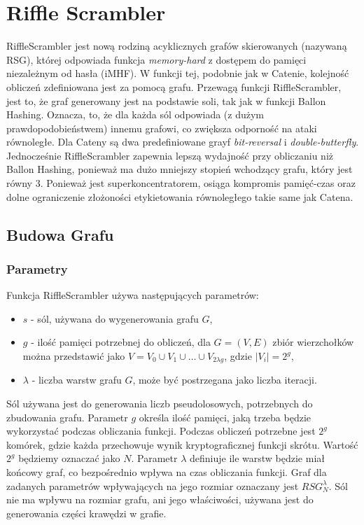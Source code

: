 \chapter{Riffle Scrambler}
\thispagestyle{chapterBeginStyle}

RiffleScrambler \cite{rs} jest nową rodziną acyklicznych grafów skierowanych (nazywaną RSG), której odpowiada funkcja \textit{memory-hard} z dostępem do pamięci niezależnym od hasła (iMHF).
W funkcji tej, podobnie jak w Catenie, kolejność obliczeń zdefiniowana jest za pomocą grafu. 
Przewagą funkcji RiffleScrambler, jest to, że graf generowany jest na podstawie soli, tak jak w funkcji Ballon Hashing. Oznacza, to, że dla każda sól odpowiada (z dużym prawdopodobieństwem) innemu grafowi, co zwiększa odporność na ataki równoległe. Dla Cateny są dwa predefiniowane grayf \textit{bit-reversal} i \textit{double-butterfly}.
Jednocześnie RiffleScrambler zapewnia lepszą wydajność przy obliczaniu niż Ballon Hashing, ponieważ ma dużo mniejszy stopień wchodzący grafu, który jest równy 3.
Ponieważ jest superkoncentratorem, osiąga kompromis pamięć-czas oraz dolne ograniczenie złożoności etykietowania równoległego takie same jak Catena.

\section{Budowa Grafu}

\subsection{Parametry}
Funkcja RiffleScrambler używa następujących parametrów:
\begin{itemize}
	\item $s$ - sól, używana do wygenerowania grafu $G$,
	
	\item $g$ - \label{rs::g} ilość pamięci potrzebnej do obliczeń, dla $G = (V, E)$ zbiór wierzchołków można przedstawić jako $V = V_{0} \cup V_{1} \cup \dots \cup V_{2 \lambda g}$, gdzie $|V_{i}| = 2^{g}$,
	
	\item $\lambda$ - liczba warstw grafu $G$, może być postrzegana jako liczba iteracji.
\end{itemize}

Sól używana jest do generowania liczb pseudolosowych, potrzebnych do zbudowania grafu.
Parametr $g$ określa ilość pamięci, jaką trzeba będzie wykorzystać podczas obliczania funkcji. Podczas obliczeń potrzebne jest $2^{g}$ komórek, gdzie każda przechowuje wynik kryptograficznej funkcji skrótu. Wartość $2^g$ będziemy oznaczać jako $N$.
Parametr $\lambda$ definiuje ile warstw będzie miał końcowy graf, co bezpośrednio wpływa na czas obliczania funkcji.
Graf dla zadanych parametrów wpływających na jego rozmiar oznaczany jest $RSG_{N}^{\lambda}$. Sól nie ma wpływu na rozmiar grafu, ani jego właściwości, używana jest do generowania części krawędzi w grafie.



